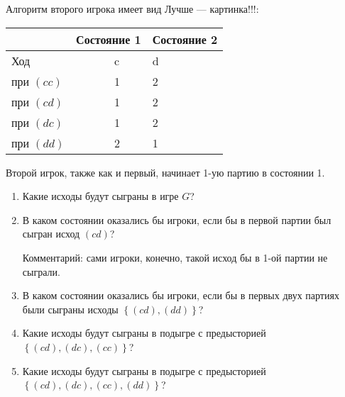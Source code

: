 \begin{problem}
Алгоритм второго игрока имеет вид {\red Лучше --- картинка!!!}:


\begin{tabular} {|p{43.12pt}| p{19.60pt}| p{37.52pt}| p{19.60pt}| p{31.92pt}| } \hline
   &  \multicolumn{2}{|l|}{ Состояние 1 } &  \multicolumn{2}{|l|}{ Состояние 2 } \\ \hline
 \multicolumn{2}{|l|}{ Ход } &  \multicolumn{2}{|l|}{ c } &  d  \\ \hline
 \multicolumn{2}{|l|}{ при  $\left(cc\right)$  } &  \multicolumn{2}{|l|}{ 1 } &  2  \\ \hline
 \multicolumn{2}{|l|}{ при  $\left(cd\right)$  } &  \multicolumn{2}{|l|}{ 1 } &  2  \\ \hline
 \multicolumn{2}{|l|}{ при  $\left(dc\right)$  } &  \multicolumn{2}{|l|}{ 1 } &  2  \\ \hline
 \multicolumn{2}{|l|}{ при  $\left(dd\right)$  } &  \multicolumn{2}{|l|}{ 2 } &  1  \\ \hline
\end{tabular}

Второй игрок, также как и первый, начинает 1-ую партию в состоянии 1.
\begin{enumerate}
\item  Какие исходы будут сыграны в игре  $G$?\par
\item В каком состоянии оказались бы игроки, если бы в первой партии был сыгран исход  $\left(cd\right)$?\par
Комментарий: сами игроки, конечно, такой исход бы в 1-ой партии не сыграли.\par
\item  В каком состоянии оказались бы игроки, если бы в первых двух партиях были сыграны исходы  $\left\{\left(cd\right),\left(dd\right)\right\}$?\par
\item Какие исходы будут сыграны в подыгре с предысторией  $\left\{\left(cd\right),\left(dc\right),\left(cc\right)\right\}$?
\item Какие исходы будут сыграны в подыгре с предысторией  $\left\{\left(cd\right),\left(dc\right),\left(cc\right),\left(dd\right)\right\}$?
\end{enumerate}


\begin{sol}

\end{sol}
\end{problem}



